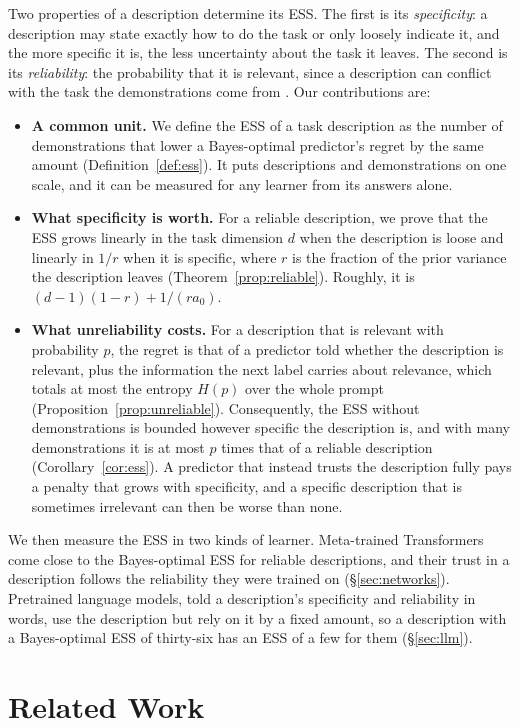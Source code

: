 \documentclass{article}
\begin{document}
Two properties of a description determine its ESS. The first is its \emph{specificity}: a description may state exactly how to do the task or only loosely indicate it, and the more specific it is, the less uncertainty about the task it leaves. The second is its \emph{reliability}: the probability that it is relevant, since a description can conflict with the task the demonstrations come from \citep{evans2006}. Our contributions are:
\begin{itemize}
    \item \textbf{A common unit.} We define the ESS of a task description as the number of demonstrations that lower a Bayes-optimal predictor's regret by the same amount (Definition~\ref{def:ess}). It puts descriptions and demonstrations on one scale, and it can be measured for any learner from its answers alone.
    \item \textbf{What specificity is worth.} For a reliable description, we prove that the ESS grows linearly in the task dimension $d$ when the description is loose and linearly in $1/r$ when it is specific, where $r$ is the fraction of the prior variance the description leaves (Theorem~\ref{prop:reliable}). Roughly, it is $(d-1)(1-r) + 1/(r a_0)$.
    \item \textbf{What unreliability costs.} For a description that is relevant with probability $p$, the regret is that of a predictor told whether the description is relevant, plus the information the next label carries about relevance, which totals at most the entropy $H(p)$ over the whole prompt (Proposition~\ref{prop:unreliable}). Consequently, the ESS without demonstrations is bounded however specific the description is, and with many demonstrations it is at most $p$ times that of a reliable description (Corollary~\ref{cor:ess}). A predictor that instead trusts the description fully pays a penalty that grows with specificity, and a specific description that is sometimes irrelevant can then be worse than none.
\end{itemize}
We then measure the ESS in two kinds of learner. Meta-trained Transformers come close to the Bayes-optimal ESS for reliable descriptions, and their trust in a description follows the reliability they were trained on (\S\ref{sec:networks}). Pretrained language models, told a description's specificity and reliability in words, use the description but rely on it by a fixed amount, so a description with a Bayes-optimal ESS of thirty-six has an ESS of a few for them (\S\ref{sec:llm}).

\section{Related Work}
\end{document}
